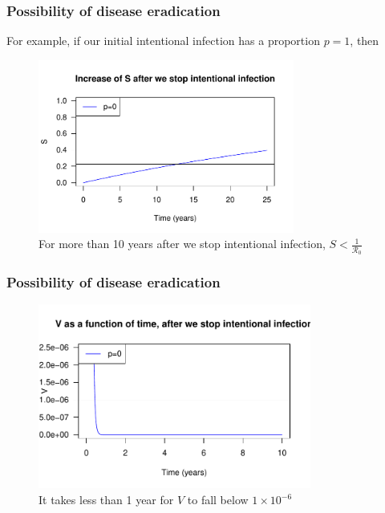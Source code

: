 \documentclass[12pt]{beamer}
\newcommand{\R}{\mathcal{R}}
\begin{document}
\begin{frame}
\frametitle{Possibility of disease eradication}

For example, if our initial intentional infection has a proportion $p=1$, then
\begin{figure}[H]
  \centering
  \includegraphics[width=0.75\textwidth]{Figures/Increase_of_S.pdf}
  \caption{For more than 10 years after we stop intentional infection, $S<\frac{1}{\R_0}$}
\label{figure:S_after_stop}
\end{figure}
\end{frame}
\begin{frame}
\frametitle{Possibility of disease eradication}
\begin{figure}[H]
  \centering
  \includegraphics[width=0.8\textwidth]{Figures/V_after_stop.pdf}
  \caption{It takes less than 1 year for $V$ to fall below $1\times10^{-6}$}
\end{figure}
\end{frame}
\end{document}
